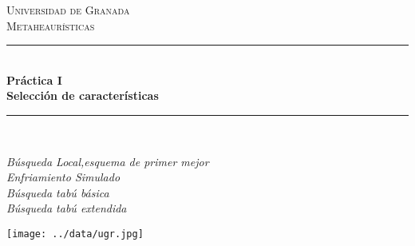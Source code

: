 \documentclass[a4paper,11pt]{article}
\begin{document}
\begin{titlepage}

\newcommand{\HRule}{\rule{\linewidth}{0.5mm}} %

\center %
 
\textsc{\LARGE Universidad de Granada}\\[1.5cm]
\textsc{\Large Metaheaurísticas}\\[0.5cm] 

\bigskip
\HRule \\[0.4cm]
{ \huge \bfseries Práctica I}\\[0.4cm] %
{ \huge \bfseries Selección de características}\\
\HRule \\[1.5cm]
 

\begin{minipage}{\textwidth}
\begin{center} \large
\emph{Búsqueda Local,esquema de primer mejor}\\
\emph{Enfriamiento Simulado}\\
\emph{Búsqueda tabú básica}\\
\emph{Búsqueda tabú extendida}\\
\end{center}
\end{minipage}


\begin{center}
\texttt{[image: ../data/ugr.jpg]}
\end{center}


\end{titlepage}
\end{document}

